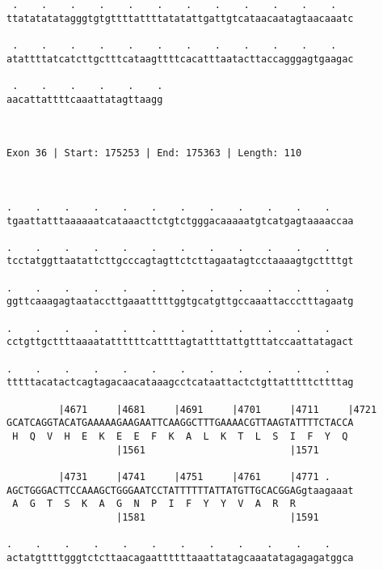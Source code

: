 \documentclass{article}
\begin{document}
\begin{Verbatim}
 .    .    .    .    .    .    .    .    .    .    .    .   
ttatatatatagggtgtgttttattttatatattgattgtcataacaatagtaacaaatc
                                                            
 .    .    .    .    .    .    .    .    .    .    .    .   
atattttatcatcttgctttcataagttttcacatttaatacttaccagggagtgaagac
                                                            
 .    .    .    .    .    .
aacattattttcaaattatagttaagg
                           
                           
 
Exon 36 | Start: 175253 | End: 175363 | Length: 110



.    .    .    .    .    .    .    .    .    .    .    .    
tgaattatttaaaaaatcataaacttctgtctgggacaaaaatgtcatgagtaaaaccaa
                                                            
.    .    .    .    .    .    .    .    .    .    .    .    
tcctatggttaatattcttgcccagtagttctcttagaatagtcctaaaagtgcttttgt
                                                            
.    .    .    .    .    .    .    .    .    .    .    .    
ggttcaaagagtaataccttgaaatttttggtgcatgttgccaaattaccctttagaatg
                                                            
.    .    .    .    .    .    .    .    .    .    .    .    
cctgttgcttttaaaatattttttcattttagtattttattgtttatccaattatagact
                                                            
.    .    .    .    .    .    .    .    .    .    .    .    
tttttacatactcagtagacaacataaagcctcataattactctgttatttttcttttag
                                                            
         |4671     |4681     |4691     |4701     |4711     |4721
GCATCAGGTACATGAAAAAGAAGAATTCAAGGCTTTGAAAACGTTAAGTATTTTCTACCA
 H  Q  V  H  E  K  E  E  F  K  A  L  K  T  L  S  I  F  Y  Q 
                   |1561                         |1571      
  
         |4731     |4741     |4751     |4761     |4771 .    
AGCTGGGACTTCCAAAGCTGGGAATCCTATTTTTTATTATGTTGCACGGAGgtaagaaat
 A  G  T  S  K  A  G  N  P  I  F  Y  Y  V  A  R  R          
                   |1581                         |1591      
  
.    .    .    .    .    .    .    .    .    .    .    .    
actatgttttgggtctcttaacagaattttttaaattatagcaaatatagagagatggca
                                                            

\end{Verbatim}
\end{document}
